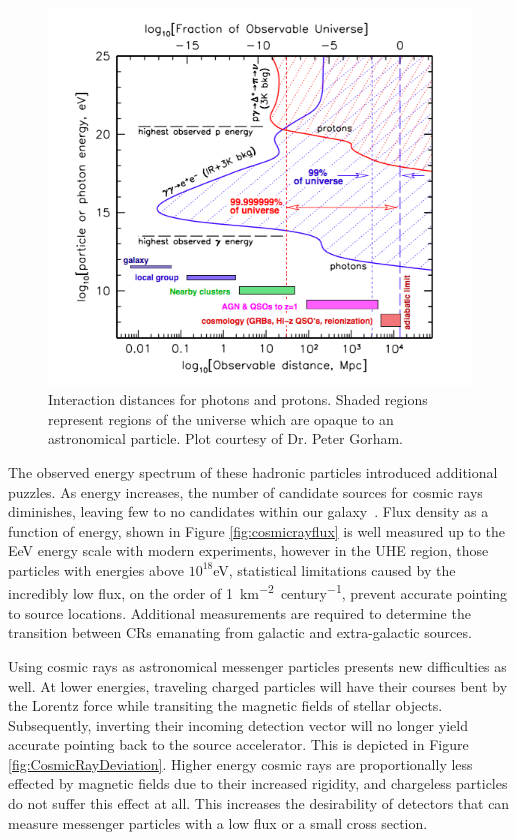 \begin{figure}
\centering
	\includegraphics[width=\textwidth]{figures/ObservableUniverse}
	\caption{Interaction distances for photons and protons.  Shaded regions represent regions of the universe which are opaque to an astronomical particle. Plot courtesy of Dr. Peter Gorham.}
\label{fig:observableUniverse}
\end{figure}
	
	The observed energy spectrum of these hadronic particles introduced additional puzzles. As energy increases, the number of candidate sources for cosmic rays diminishes, leaving few to no candidates within our galaxy~\cite{RevModPhys.71.S33}.  Flux density as a function of energy, shown in Figure \ref{fig:cosmicrayflux} is well measured up to the EeV energy scale with modern experiments, however in the UHE region, those particles with energies above $10^{18}$eV, statistical limitations caused by the incredibly low flux, on the order of \SI{1}{\km^{-2} century^{-1}}, prevent accurate pointing to source locations.  Additional measurements are required to determine the transition between CRs emanating from galactic and extra-galactic sources.

	Using cosmic rays as astronomical messenger particles presents new difficulties as well.  At lower energies, traveling charged particles will have their courses bent by the Lorentz force while transiting the magnetic fields of stellar objects. Subsequently, inverting their incoming detection vector will no longer yield accurate pointing back to the source accelerator.  This is depicted in Figure \ref{fig:CosmicRayDeviation}.  Higher energy cosmic rays are proportionally less effected by magnetic fields due to their increased rigidity, and chargeless particles do not suffer this effect at all.  This increases the desirability of detectors that can measure messenger particles with a low flux or a small cross section.
	
